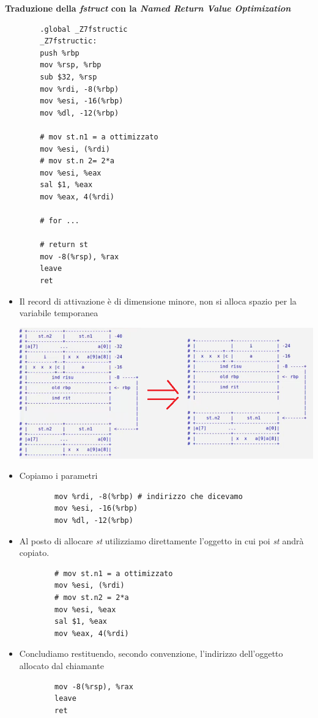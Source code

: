 \documentclass[11pt]{report}
\theoremstyle{definition}
\begin{document}
\noindent \textbf{Traduzione della \emph{fstruct} con la \emph{Named Return Value Optimization}}
\begin{multicols}{2}
	\begin{verbatim}
		.global _Z7fstructic
		_Z7fstructic:
		push %rbp
		mov %rsp, %rbp
		sub $32, %rsp
		mov %rdi, -8(%rbp)
		mov %esi, -16(%rbp)
		mov %dl, -12(%rbp)
		
		# mov st.n1 = a ottimizzato
		mov %esi, (%rdi)
		# mov st.n 2= 2*a 
		mov %esi, %eax
		sal $1, %eax
		mov %eax, 4(%rdi)
		
		# for ...
		
		# return st
		mov -8(%rsp), %rax
		leave
		ret
	\end{verbatim}
\end{multicols}
\small
\begin{itemize}
	\item Il record di attivazione è di dimensione minore, non si alloca spazio per la variabile temporanea \begin{center}
		\includegraphics[scale=0.86]{img/45.PNG}
	\end{center}  
	\item Copiamo i parametri
	\begin{verbatim}
		mov %rdi, -8(%rbp) # indirizzo che dicevamo
		mov %esi, -16(%rbp) 
		mov %dl, -12(%rbp)
	\end{verbatim}
	\item Al posto di allocare \emph{st} utilizziamo direttamente l'oggetto in cui poi \emph{st} andrà copiato. 
	\begin{verbatim}
		# mov st.n1 = a ottimizzato
		mov %esi, (%rdi)
		# mov st.n2 = 2*a 
		mov %esi, %eax
		sal $1, %eax
		mov %eax, 4(%rdi)
	\end{verbatim}
	\item Concludiamo restituendo, secondo convenzione, l'indirizzo dell'oggetto allocato dal chiamante
	\begin{verbatim}
		mov -8(%rsp), %rax
		leave
		ret
	\end{verbatim}
\end{itemize}
\normalsize 
\end{document}
